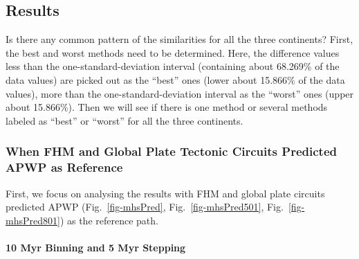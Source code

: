 \subsection{Results}

Is there any common pattern of the similarities for all the three continents?
First, the best and worst methods need to be determined. Here, the difference
values less than the one-standard-deviation interval (containing about 68.269\%
of the data values) are picked out as the ``best'' ones (lower about 15.866\% of
the data values), more than the one-standard-deviation interval as the ``worst''
ones (upper about 15.866\%). Then we will see if there is one method or several
methods labeled as ``best'' or ``worst'' for all the three continents.

\subsubsection{When FHM and Global Plate Tectonic Circuits Predicted APWP as
Reference}

First, we focus on analysing the results with FHM and global plate circuits
predicted APWP (Fig.~\ref{fig-mhsPred}, Fig.~\ref{fig-mhsPred501},
Fig.~\ref{fig-mhsPred801}) as the reference path.

\paragraph{10 Myr Binning and 5 Myr Stepping}

